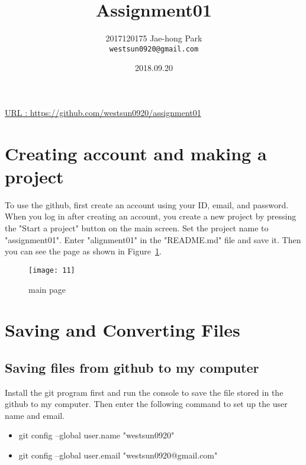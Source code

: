 \documentclass{article}
\title{Assignment01} %
\author{2017120175 Jae-hong Park\\ \texttt{westsun0920@gmail.com}} %
\date{2018.09.20} %
\begin{document}
\maketitle %

\href{https://github.com/westsun0920/assignment01}{URL : https://github.com/westsun0920/assignment01}


\section{Creating account and making a project} %

To use the github, first create an account using your ID, email, and password.
When you log in after creating an account, you create a new project by pressing the "Start a project" button on the main screen. 
Set the project name to "assignment01".
Enter "alignment01" in the "README.md" file and save it.
Then you can see the page as shown in Figure~\ref{fig:main page}.


\begin{figure}[h]
	\centering
	\texttt{[image: 11]}
	\caption{main page}
	\label{fig:main page}
\end{figure}








\section{Saving and Converting Files}

\subsection{Saving files from github to my computer}
Install the git program first and run the console to save the file stored in the github to my computer.
Then enter the following command to set up the user name and email.

\begin{itemize}
	\item git config --global user.name "westsun0920"
	\item git config --global user.email "westsun0920@gmail.com"
\end{itemize}
\end{document}
